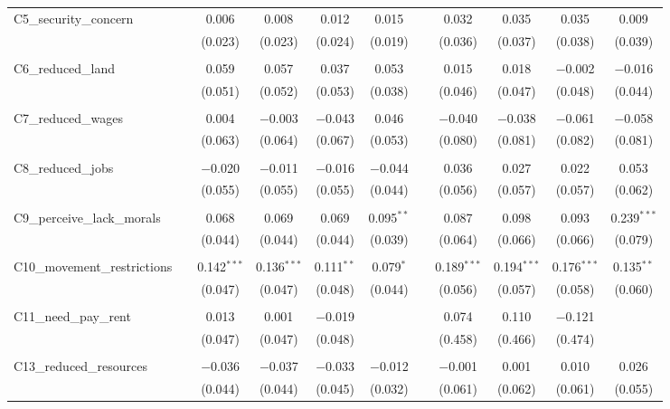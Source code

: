 \begin{table}[H]
\begin{tabular}{@{\extracolsep{4pt}}lcccccccccc}
 C5\_security\_concern &  & 0.006 & 0.008 & 0.012 & 0.015 &  & 0.032 & 0.035 & 0.035 & 0.009 \\ 
  &  & (0.023) & (0.023) & (0.024) & (0.019) &  & (0.036) & (0.037) & (0.038) & (0.039) \\ 
  & & & & & & & & & & \\ 
 C6\_reduced\_land &  & 0.059 & 0.057 & 0.037 & 0.053 &  & 0.015 & 0.018 & $-$0.002 & $-$0.016 \\ 
  &  & (0.051) & (0.052) & (0.053) & (0.038) &  & (0.046) & (0.047) & (0.048) & (0.044) \\ 
  & & & & & & & & & & \\ 
 C7\_reduced\_wages &  & 0.004 & $-$0.003 & $-$0.043 & 0.046 &  & $-$0.040 & $-$0.038 & $-$0.061 & $-$0.058 \\ 
  &  & (0.063) & (0.064) & (0.067) & (0.053) &  & (0.080) & (0.081) & (0.082) & (0.081) \\ 
  & & & & & & & & & & \\ 
 C8\_reduced\_jobs &  & $-$0.020 & $-$0.011 & $-$0.016 & $-$0.044 &  & 0.036 & 0.027 & 0.022 & 0.053 \\ 
  &  & (0.055) & (0.055) & (0.055) & (0.044) &  & (0.056) & (0.057) & (0.057) & (0.062) \\ 
  & & & & & & & & & & \\ 
 C9\_perceive\_lack\_morals &  & 0.068 & 0.069 & 0.069 & 0.095$^{**}$ &  & 0.087 & 0.098 & 0.093 & 0.239$^{***}$ \\ 
  &  & (0.044) & (0.044) & (0.044) & (0.039) &  & (0.064) & (0.066) & (0.066) & (0.079) \\ 
  & & & & & & & & & & \\ 
 C10\_movement\_restrictions &  & 0.142$^{***}$ & 0.136$^{***}$ & 0.111$^{**}$ & 0.079$^{*}$ &  & 0.189$^{***}$ & 0.194$^{***}$ & 0.176$^{***}$ & 0.135$^{**}$ \\ 
  &  & (0.047) & (0.047) & (0.048) & (0.044) &  & (0.056) & (0.057) & (0.058) & (0.060) \\ 
  & & & & & & & & & & \\ 
 C11\_need\_pay\_rent &  & 0.013 & 0.001 & $-$0.019 &  &  & 0.074 & 0.110 & $-$0.121 &  \\ 
  &  & (0.047) & (0.047) & (0.048) &  &  & (0.458) & (0.466) & (0.474) &  \\ 
  & & & & & & & & & & \\ 
 C13\_reduced\_resources &  & $-$0.036 & $-$0.037 & $-$0.033 & $-$0.012 &  & $-$0.001 & 0.001 & 0.010 & 0.026 \\ 
  &  & (0.044) & (0.044) & (0.045) & (0.032) &  & (0.061) & (0.062) & (0.061) & (0.055) \\ 

\end{tabular}
\end{table}
